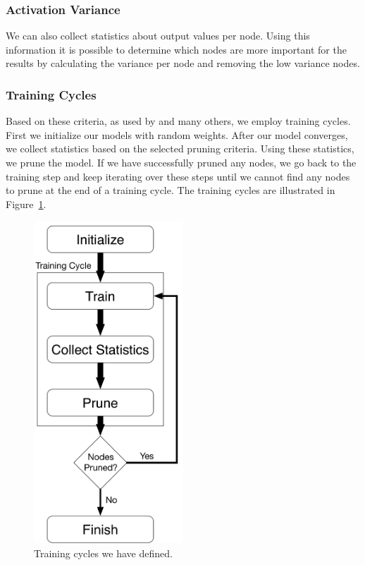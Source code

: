 \subsubsection{Activation Variance}
We can also collect statistics about output values per node. Using this information it is possible to determine which nodes are more important for the results by calculating the variance per node and removing the low variance nodes. 

\subsubsection{Training Cycles}
Based on these criteria, as used by \cite{Hu:2016aa} and many others, we employ training cycles. First we initialize our models with random weights. After our model converges, we collect statistics based on the selected pruning criteria. Using these statistics, we prune the model. If we have successfully pruned any nodes, we go back to the training step and keep iterating over these steps until we cannot find any nodes to prune at the end of a training cycle. The training cycles are illustrated in Figure~\ref{fig:training_cycles}.

\begin{figure}[!h]
  \begin{center}
  \includegraphics[width=0.5\textwidth]{images/training_cycle}
  \end{center}
  \caption{Training cycles we have defined.}
  \label{fig:training_cycles}
\end{figure}

